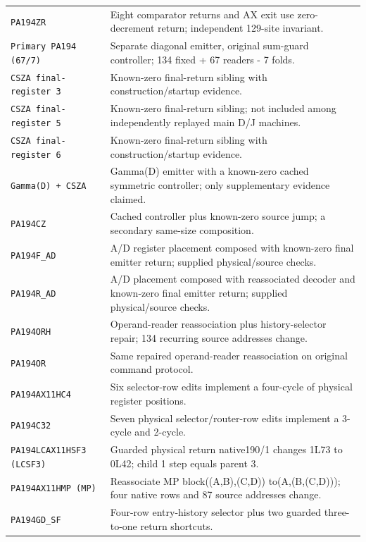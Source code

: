 \begin{longtable}{@{}p{.29\linewidth}p{.65\linewidth}@{}}
\texttt{PA194ZR} & Eight comparator returns and AX exit use zero-decrement return; independent 129-site invariant.\\[3pt]
\texttt{Primary PA194 (67/7)} & Separate diagonal emitter, original sum-guard controller; 134 fixed + 67 readers - 7 folds.\\[3pt]
\texttt{CSZA final-register 3} & Known-zero final-return sibling with construction/startup evidence.\\[3pt]
\texttt{CSZA final-register 5} & Known-zero final-return sibling; not included among independently replayed main D/J machines.\\[3pt]
\texttt{CSZA final-register 6} & Known-zero final-return sibling with construction/startup evidence.\\[3pt]
\texttt{Gamma(D) + CSZA} & Gamma(D) emitter with a known-zero cached symmetric controller; only supplementary evidence claimed.\\[3pt]
\texttt{PA194CZ} & Cached controller plus known-zero source jump; a secondary same-size composition.\\[3pt]
\texttt{PA194F\_\allowbreak AD} & A/D register placement composed with known-zero final emitter return; supplied physical/source checks.\\[3pt]
\texttt{PA194R\_\allowbreak AD} & A/D placement composed with reassociated decoder and known-zero final emitter return; supplied physical/source checks.\\[3pt]
\texttt{PA194ORH} & Operand-reader reassociation plus history-selector repair; 134 recurring source addresses change.\\[3pt]
\texttt{PA194OR} & Same repaired operand-reader reassociation on original command protocol.\\[3pt]
\texttt{PA194AX11HC4} & Six selector-row edits implement a four-cycle of physical register positions.\\[3pt]
\texttt{PA194C32} & Seven physical selector/router-row edits implement a 3-cycle and 2-cycle.\\[3pt]
\texttt{PA194LCAX11HSF3 (LCSF3)} & Guarded physical return native190/1 changes 1L73 to 0L42; child 1 step equals parent 3.\\[3pt]
\texttt{PA194AX11HMP (MP)} & Reassociate MP block((A,B),(C,D)) to(A,(B,(C,D))); four native rows and 87 source addresses change.\\[3pt]
\texttt{PA194GD\_\allowbreak SF} & Four-row entry-history selector plus two guarded three-to-one return shortcuts.\\[3pt]

\end{longtable}
